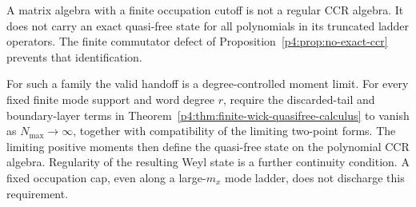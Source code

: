 \documentclass[12pt,a4paper]{article}
\begin{document}
\begin{remark}
\label{p4:rem:truncated-boson-quasifree-boundary}
A matrix algebra with a finite occupation cutoff is not a regular CCR
algebra.  It does not carry an exact quasi-free state for all polynomials in
its truncated ladder operators.  The finite commutator defect of
Proposition~\ref{p4:prop:no-exact-ccr} prevents that identification.

For such a family the valid handoff is a degree-controlled moment limit.
For every fixed finite mode support and word degree \(r\), require the
discarded-tail and boundary-layer terms in
Theorem~\ref{p4:thm:finite-wick-quasifree-calculus} to vanish as
\(N_{\max}\to\infty\), together with compatibility of the limiting
two-point forms.  The limiting positive moments then define the quasi-free
state on the polynomial CCR algebra.  Regularity of the resulting Weyl
state is a further continuity condition.  A fixed occupation cap, even
along a large-\(m_x\) mode ladder, does not discharge this requirement.
\end{remark}
\end{document}
